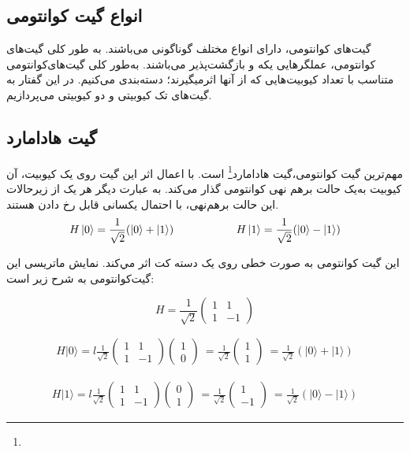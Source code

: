 \documentclass{book}
\begin{document}
\subsection{انواع گیت کوانتومی}
گیت‌های کوانتومی، دارای انواع مختلف گوناگونی می‌باشند. به طور کلی گیت‌های کوانتومی، عملگر‌هایی یکه و بازگشت‌پذیر می‌باشند. به‌طور کلی گیت‌های‌کوانتومی متناسب با تعداد کیوبیت‌هایی که از آنها اثر‌میگیرند؛ دسته‌بندی می‌کنیم. در این گفتار به گیت‌های تک کیوبیتی و دو کیوبیتی می‌پردازیم.
\subsection*{گیت هادامارد}
مهم‌ترین گیت کوانتومی،‌گیت هادامارد\footnote{} است. با اعمال اثر این گیت روی یک کیوبیت، آن کیوبیت به‌یک حالت برهم نهی‌ کوانتومی‌ گذار‌ می‌کند. به عبارت دیگر هر یک از زیرحالات این حالت برهم‌نهی، با احتمال یکسانی قابل رخ دادن‌ هستند. 
\vspace{1cm}
$$
H\ket{0} = \frac{1}{\sqrt{2}} (\ket{0} + \ket{1})
\hspace{2cm}
H\ket{1} = \frac{1}{\sqrt{2}} (\ket{0} - \ket{1})
$$
\vspace{1cm}

این گیت کوانتومی‌ به صورت خطی روی یک دسته‌ کت اثر مي‌کند. نمایش ماتریسی این گیت‌کوانتومی به شرح زیر است:
\begin{center}
	\[
	H = \frac{1}{\sqrt{2}}
	\begin{pmatrix}
		1 & 1 \\
		1 & -1
	\end{pmatrix}
	\]
\end{center}





\begin{align*}
	H |0\rangle = l\frac{1}{\sqrt{2}} \begin{pmatrix} 1 & 1 \\ 1 & -1 \end{pmatrix} \begin{pmatrix} 1 \\ 0 \end{pmatrix} \
	= \frac{1}{\sqrt{2}} \begin{pmatrix} 1 \\ 1 \end{pmatrix} \
	= \frac{1}{\sqrt{2}} (|0\rangle + |1\rangle)
\end{align*}

\begin{align*}
	H |1\rangle = l\frac{1}{\sqrt{2}} \begin{pmatrix} 1 & 1 \\ 1 & -1 \end{pmatrix} \begin{pmatrix} 0 \\ 1 \end{pmatrix} \
	= \frac{1}{\sqrt{2}} \begin{pmatrix} 1 \\ -1 \end{pmatrix} \
	= \frac{1}{\sqrt{2}} (|0\rangle - |1\rangle)
\end{align*}
\end{document}
